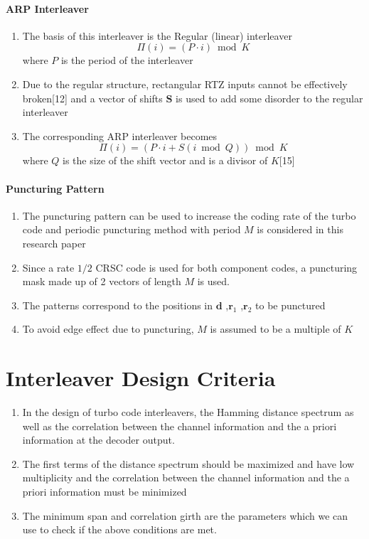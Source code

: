 \documentclass[fontsize=12pt]{article}
\begin{document}
\paragraph{ARP Interleaver \newline}
\begin{enumerate}
\item The basis of this interleaver is the Regular (linear) interleaver $$\Pi(i)=(P \cdot i) \bmod K$$ where $P$ is the period  of the interleaver

\item Due to the regular structure, rectangular RTZ inputs cannot be effectively broken[12] and a vector of shifts $\mathbf{S}$ is used to add some disorder to the regular interleaver

\item The corresponding ARP interleaver becomes $$\Pi(i)=(P \cdot i + S(i \bmod Q)) \bmod K$$ where $Q$ is the size of the shift vector and is a divisor of $K$[15]
\end{enumerate}

\paragraph{Puncturing Pattern \newline}
\begin{enumerate}
\item The puncturing pattern can be used to increase the coding rate of the turbo code and periodic puncturing method with period $M$ is considered in this research paper

\item Since a rate $1/2$ CRSC code is used for both component codes, a puncturing mask made up of 2 vectors of length $M$ is used. 

\item The patterns correspond to the positions in $\mathbf{d}$ ,$\mathbf{r}_1$ ,$\mathbf{r}_2$ to be punctured

\item To avoid edge effect due to puncturing, $M$ is assumed to be a multiple of $K$
\end{enumerate}

\section{Interleaver Design Criteria}
\begin{enumerate}
\item In the design of turbo code interleavers, the Hamming distance spectrum as well as the correlation between the channel information and the a priori information at the decoder output.

\item The first terms of the distance spectrum should be maximized and have low multiplicity and the correlation between the channel information and the a priori information must be minimized

\item The minimum span and correlation girth are the parameters which we can use to check if the above conditions are met.
\end{enumerate}
\end{document}
